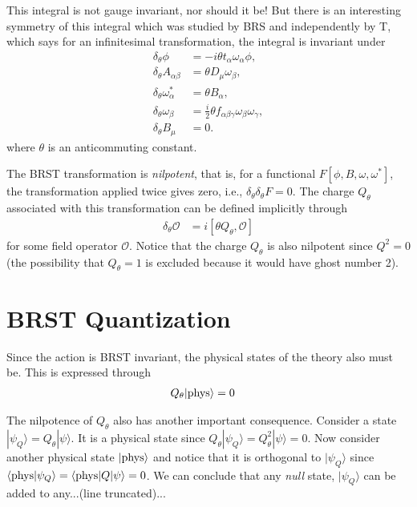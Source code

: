 \documentclass[notitlepage,amsmath,amssymb,aps, pra, 10pt]{revtex4-1}
\begin{document}
    This integral is not gauge invariant, nor should it be! But there is an interesting symmetry of this integral which was studied by BRS and independently by T, which says for an infinitesimal transformation, the integral is invariant under
    \begin{align}
        \delta_{\theta} \phi &= -i \theta t_{\alpha} \omega_{\alpha} \phi,\\
        \delta_{\theta} A_{\alpha \beta} &= \theta D_{\mu} \omega_{\beta},\\
        \delta_{\theta} \omega_{\alpha}^* &= \theta B_{\alpha},\\
        \delta_{\theta} \omega_{\beta} &= \frac{i}{2} \theta f_{\alpha\beta\gamma}\omega_{\beta}\omega_{\gamma},\\
        \delta_{\theta} B_{\mu}  &= 0.
    \end{align}
    where $\theta$ is an anticommuting constant.

    The BRST transformation is \emph{nilpotent}, that is, for a functional $F[\phi, B, \omega, \omega^*]$, the transformation applied twice gives zero, i.e., $\delta_{\theta}\delta_{\theta} F = 0$. The charge $Q_{\theta}$ associated with this transformation can be defined implicitly through
    \begin{align}
        \delta_{\theta} \mathcal{O} & = i [\theta Q_{\theta}, \mathcal{O}]
    \end{align}
    for some field operator $\mathcal{O}$. Notice that the charge $Q_{\theta}$ is also nilpotent since $Q^2 = 0$ (the possibility that $Q_{\theta} = 1$ is excluded because it would have ghost number 2).


\section{BRST Quantization}
    Since the action is BRST invariant, the physical states of the theory also must be. This is expressed through
    \begin{align}
        Q_{\theta} | \rm phys \rangle &=0
    \end{align}

    The nilpotence of $Q_{\theta}$ also has another important consequence. Consider a state $| \psi_Q  \rangle = Q_{\theta} | \psi \rangle$. It is a physical state since $Q_{\theta} |\psi_Q \rangle = Q_{\theta}^2 | \psi \rangle = 0$. Now consider another physical state $| {\rm phys} \rangle$ and notice that it is orthogonal to $|\psi_Q\rangle$ since $\langle {\rm phys} | \psi_Q \rangle = \langle {\rm phys} |Q| \psi\rangle = 0$. We can conclude that any \emph{null} state, $|\psi_Q\rangle$ can be added to any...(line truncated)...
\end{document}

